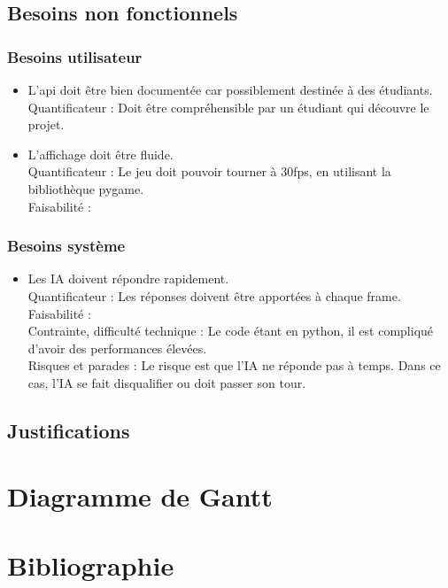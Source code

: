 \documentclass[french]{article}
\begin{document}
\subsection{Besoins non fonctionnels}
\subsubsection{Besoins utilisateur}
    \begin{itemize}
        \item L'api doit être bien documentée car possiblement destinée à des étudiants.\\
            Quantificateur : Doit être compréhensible par un étudiant qui découvre le projet. \\

        \item L'affichage doit être fluide.\\
            Quantificateur : Le jeu doit pouvoir tourner à 30fps, en utilisant la bibliothèque pygame.\\
            Faisabilité : \\


    \end{itemize}
\subsubsection{Besoins système}
    \begin{itemize}

        \item Les IA doivent répondre rapidement.\\
            Quantificateur : Les réponses doivent être apportées à chaque frame.\\
            Faisabilité : \\
            Contrainte, difficulté technique : Le code étant en python, il est compliqué d'avoir des performances élevées.\\
            Risques et parades : Le risque est que l'IA ne réponde pas à temps. Dans ce cas, l'IA se fait disqualifier ou doit passer son tour.\\
    \end{itemize}

\subsection{Justifications}

\section{Diagramme de Gantt}

\section{Bibliographie}

\printbibliography[title={}]
\end{document}
